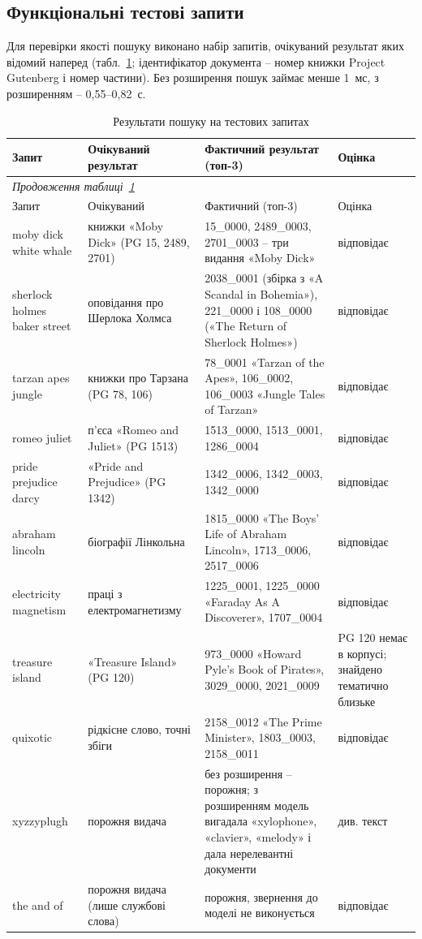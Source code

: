 \subsection{Функціональні тестові запити}

Для перевірки якості пошуку виконано набір запитів, очікуваний результат яких відомий
наперед (табл.~\ref{tab:queries}; ідентифікатор документа -- номер книжки Project Gutenberg і
номер частини). Без розширення пошук займає менше 1~мс, з розширенням -- 0,55--0,82~с.

\begin{longtable}{p{}p{}p{}p{}}
\caption{Результати пошуку на тестових запитах}\label{tab:queries}\\
\toprule
Запит & Очікуваний результат & Фактичний результат (топ-3) & Оцінка\\
\midrule\endfirsthead
\multicolumn{4}{l}{\textit{Продовження таблиці~\ref{tab:queries}}}\\
\toprule Запит & Очікуваний & Фактичний (топ-3) & Оцінка\\ \midrule\endhead
moby dick white whale & книжки «Moby Dick» (PG 15, 2489, 2701) & 15\_0000, 2489\_0003,
2701\_0003 -- три видання «Moby Dick» & відповідає\\
sherlock holmes baker street & оповідання про Шерлока Холмса & 2038\_0001 (збірка з «A Scandal
in Bohemia»), 221\_0000 і 108\_0000 («The Return of Sherlock Holmes») & відповідає\\
tarzan apes jungle & книжки про Тарзана (PG 78, 106) & 78\_0001 «Tarzan of the Apes»,
106\_0002, 106\_0003 «Jungle Tales of Tarzan» & відповідає\\
romeo juliet & п'єса «Romeo and Juliet» (PG 1513) & 1513\_0000, 1513\_0001, 1286\_0004 &
відповідає\\
pride prejudice darcy & «Pride and Prejudice» (PG 1342) & 1342\_0006, 1342\_0003, 1342\_0000 &
відповідає\\
abraham lincoln & біографії Лінкольна & 1815\_0000 «The Boys' Life of Abraham Lincoln»,
1713\_0006, 2517\_0006 & відповідає\\
electricity magnetism & праці з електромагнетизму & 1225\_0001, 1225\_0000 «Faraday As A
Discoverer», 1707\_0004 & відповідає\\
treasure island & «Treasure Island» (PG 120) & 973\_0000 «Howard Pyle's Book of Pirates»,
3029\_0000, 2021\_0009 & PG 120 немає в корпусі; знайдено тематично близьке\\
quixotic & рідкісне слово, точні збіги & 2158\_0012 «The Prime Minister», 1803\_0003,
2158\_0011 & відповідає\\
xyzzyplugh & порожня видача & без розширення -- порожня; з розширенням модель вигадала
«xylophone», «clavier», «melody» і дала нерелевантні документи & див. текст\\
the and of & порожня видача (лише службові слова) & порожня, звернення до моделі не
виконується & відповідає\\
\bottomrule
\end{longtable}

